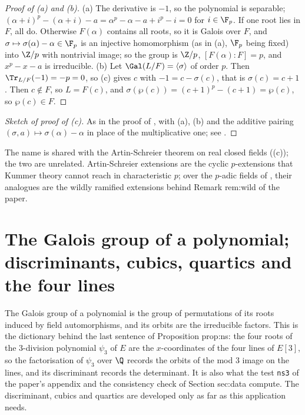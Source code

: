 \begin{proof}[Proof of (a) and (b)]
(a) The derivative is $-1$, so the polynomial is separable; $(\alpha+i)^p-(\alpha+i)-a=\alpha^p-\alpha-a+i^p-i=0$ for $i\in\F_p$. If one root lies in $F$, all do.
Otherwise $F(\alpha)$ contains all roots, so it is Galois over $F$, and $\sigma\mapsto\sigma(\alpha)-\alpha\in\F_p$ is an injective homomorphism (as in
(a), $\F_p$ being fixed) into $\Z/p$ with nontrivial image; so the group is $\Z/p$, $[F(\alpha):F]=p$, and $x^p-x-a$ is irreducible.
(b) Let $\Gal(L/F)=\langle\sigma\rangle$ of order $p$. Then $\Tr_{L/F}(-1)=-p=0$, so (c) gives $c$ with $-1=c-\sigma(c)$, that is $\sigma(c)=c+1$.
Then $c\notin F$, so $L=F(c)$, and $\sigma(\wp(c))=(c+1)^p-(c+1)=\wp(c)$, so $\wp(c)\in F$.
\end{proof}

\begin{proof}[Sketch of proof of (c)]
As in the proof of , with (a), (b) and the additive pairing $(\sigma,a)\mapsto\sigma(\alpha)-\alpha$ in place of the
multiplicative one; see \cite[Chapter VI, Section 8]{Lang}.
\end{proof}

The name is shared with the Artin-Schreier theorem on real closed fields ((c)); the two are unrelated. Artin-Schreier
extensions are the cyclic $p$-extensions that Kummer theory cannot reach in characteristic $p$; over the $p$-adic fields of , their analogues are
the wildly ramified extensions behind Remark rem:wild of the paper.

\section[The Galois group of a polynomial]{The Galois group of a polynomial; discriminants, cubics, quartics and the four lines}\label{sec:galois:polynomials}

The Galois group of a polynomial is the group of permutations of its roots induced by field automorphisms, and its orbits are the irreducible factors.
This is the dictionary behind the last sentence of Proposition prop:ns: the four roots of the $3$-division polynomial $\psi_3$ of $E$ are the $x$-coordinates of
the four lines of $E[3]$, so the factorisation of $\psi_3$ over $\Q$ records the orbits of the mod $3$ image on the lines, and its discriminant records the
determinant. It is also what the test \texttt{ns3} of the paper's appendix and the consistency check of Section sec:data compute. The discriminant, cubics and
quartics are developed only as far as this application needs.

